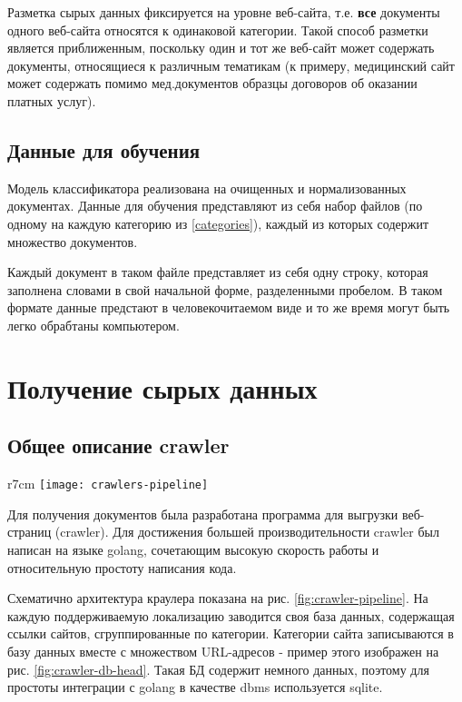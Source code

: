 Разметка сырых данных фиксируется на уровне веб-сайта, т.е. \textbf{все} документы одного веб-сайта относятся к одинаковой категории.
Такой способ разметки является приближенным, поскольку один и тот же веб-сайт может содержать документы, относящиеся к различным тематикам (к примеру, медицинский сайт может содержать помимо мед.документов образцы договоров об оказании платных услуг).
\subsection{Данные для обучения}
Модель классификатора реализована на очищенных и нормализованных документах.
Данные для обучения представляют из себя набор файлов (по одному на каждую категорию из \ref{categories}), каждый из которых содержит множество документов.

Каждый документ в таком файле представляет из себя одну строку, которая заполнена словами в свой начальной форме, разделенными пробелом.
В таком формате данные предстают в человекочитаемом виде и то же время могут быть легко обрабтаны компьютером.

\section{Получение сырых данных}
\label{sec:data-mining}
\subsection{Общее описание \gls{crawler}}
\begin{wrapfigure}{r}{7cm}
    \centering
    \texttt{[image: crawlers-pipeline]}
    \caption{Архитектура \gls{crawler}}
    \label{fig:crawler-pipeline}
\end{wrapfigure}
Для получения документов была разработана программа для выгрузки веб-страниц (\gls{crawler}).
Для достижения большей производительности \gls{crawler} был написан на языке \gls{golang}, сочетающим высокую скорость работы и относительную простоту написания кода.

Схематично архитектура краулера показана на рис. \ref{fig:crawler-pipeline}.
На каждую поддерживаемую локализацию заводится своя база данных, содержащая ссылки сайтов, сгруппированные по категории.
Категории сайта записываются в базу данных вместе с множеством URL-адресов - пример этого изображен на рис. \ref{fig:crawler-db-head}.
Такая БД содержит немного данных, поэтому для простоты интеграции с \gls{golang} в качестве \acrshort{dbms} используется \gls{sqlite}.

